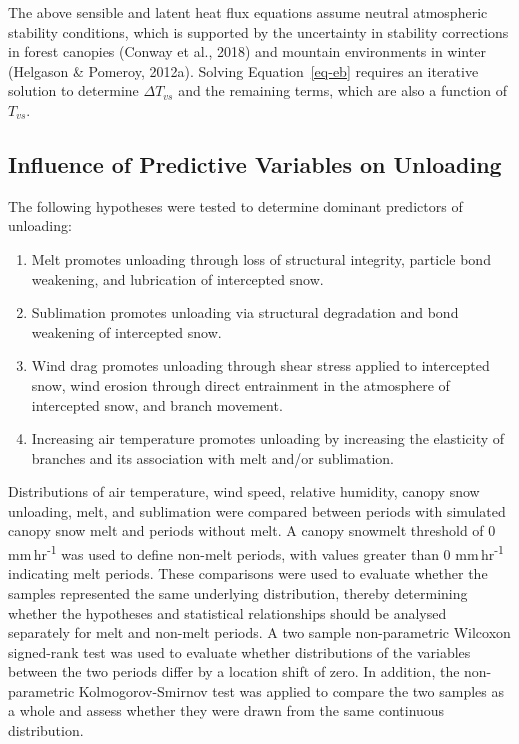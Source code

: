 \documentclass[
]{agujournal2019}
\providecommand{\tightlist}{%
  \setlength{\itemsep}{0pt}\setlength{\parskip}{0pt}}
\begin{document}
The above sensible and latent heat flux equations assume neutral
atmospheric stability conditions, which is supported by the uncertainty
in stability corrections in forest canopies (Conway et al., 2018) and
mountain environments in winter (Helgason \& Pomeroy, 2012a). Solving
Equation~\ref{eq-eb} requires an iterative solution to determine
\(\Delta T_{vs}\) and the remaining terms, which are also a function of
\(T_{vs}\).

\subsection{Influence of Predictive Variables on
Unloading}\label{influence-of-predictive-variables-on-unloading}

The following hypotheses were tested to determine dominant predictors of
unloading:

\begin{enumerate}
\def\labelenumi{\alph{enumi}.}
\tightlist
\item
  Melt promotes unloading through loss of structural integrity, particle
  bond weakening, and lubrication of intercepted snow.
\item
  Sublimation promotes unloading via structural degradation and bond
  weakening of intercepted snow.
\item
  Wind drag promotes unloading through shear stress applied to
  intercepted snow, wind erosion through direct entrainment in the
  atmosphere of intercepted snow, and branch movement.
\item
  Increasing air temperature promotes unloading by increasing the
  elasticity of branches and its association with melt and/or
  sublimation.
\end{enumerate}

Distributions of air temperature, wind speed, relative humidity, canopy
snow unloading, melt, and sublimation were compared between periods with
simulated canopy snow melt and periods without melt. A canopy snowmelt
threshold of 0 mm\,hr\textsuperscript{-1} was used to define non-melt
periods, with values greater than 0 mm\,hr\textsuperscript{-1}
indicating melt periods. These comparisons were used to evaluate whether
the samples represented the same underlying distribution, thereby
determining whether the hypotheses and statistical relationships should
be analysed separately for melt and non-melt periods. A two sample
non-parametric Wilcoxon signed-rank test was used to evaluate whether
distributions of the variables between the two periods differ by a
location shift of zero. In addition, the non-parametric
Kolmogorov-Smirnov test was applied to compare the two samples as a
whole and assess whether they were drawn from the same continuous
distribution.
\end{document}
